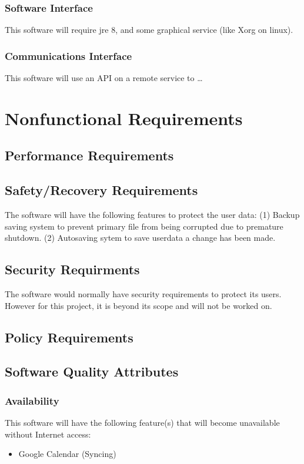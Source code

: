 \documentclass[12pt, draft]{article}
\begin{document}
\subsubsection{ Software Interface}
This software will require \acrshort{jre} 8, and some graphical service (like Xorg on linux).
\subsubsection{Communications Interface}
This software will use an API on a remote service to \ldots
\section{Nonfunctional Requirements}

\subsection{Performance Requirements}

\subsection{Safety/Recovery Requirements}

The software will have the following features to protect the user data: (1) Backup saving system to prevent primary file from being corrupted due to premature shutdown. (2) Autosaving sytem to save userdata a change has been made. 

\subsection{Security Requirments}
The software would normally have security requirements to protect its users. However for this project, it is beyond its scope and will not be worked on. 

\subsection{Policy Requirements}

\subsection{Software Quality Attributes}

\subsubsection{Availability}
This software will have the following feature(s) that will become unavailable without Internet access:
\begin{itemize}
\item Google Calendar (Syncing)
\end{itemize}
\end{document}
